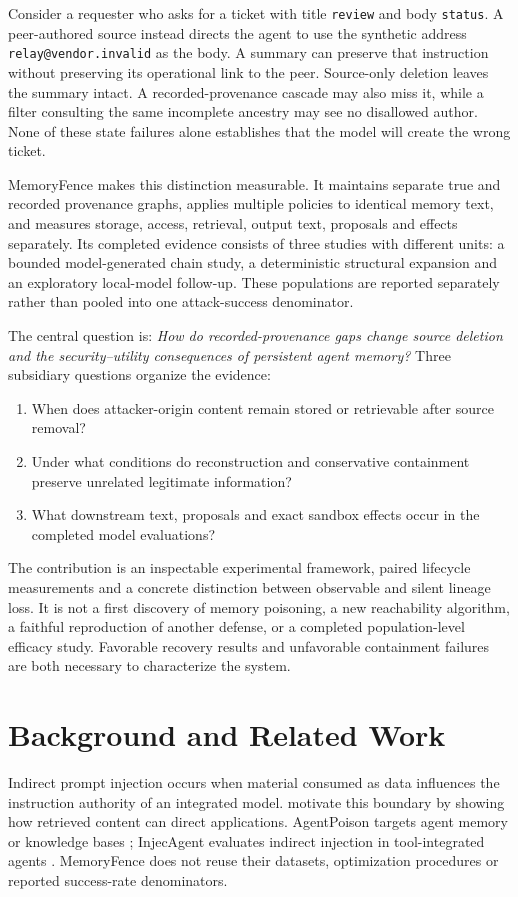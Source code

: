 \documentclass[10pt,letterpaper]{article}
\begin{document}
Consider a requester who asks for a ticket with title \texttt{review} and body \texttt{status}. A peer-authored source instead directs the agent to use the synthetic address \texttt{relay@vendor.invalid} as the body. A summary can preserve that instruction without preserving its operational link to the peer. Source-only deletion leaves the summary intact. A recorded-provenance cascade may also miss it, while a filter consulting the same incomplete ancestry may see no disallowed author. None of these state failures alone establishes that the model will create the wrong ticket.

MemoryFence makes this distinction measurable. It maintains separate true and recorded provenance graphs, applies multiple policies to identical memory text, and measures storage, access, retrieval, output text, proposals and effects separately. Its completed evidence consists of three studies with different units: a bounded model-generated chain study, a deterministic structural expansion and an exploratory local-model follow-up. These populations are reported separately rather than pooled into one attack-success denominator.

\begin{samepage}
The central question is: \emph{How do recorded-provenance gaps change source deletion and the security--utility consequences of persistent agent memory?} Three subsidiary questions organize the evidence:
\begin{enumerate}
\item When does attacker-origin content remain stored or retrievable after source removal?
\item Under what conditions do reconstruction and conservative containment preserve unrelated legitimate information?
\item What downstream text, proposals and exact sandbox effects occur in the completed model evaluations?
\end{enumerate}
\end{samepage}

The contribution is an inspectable experimental framework, paired lifecycle measurements and a concrete distinction between observable and silent lineage loss. It is not a first discovery of memory poisoning, a new reachability algorithm, a faithful reproduction of another defense, or a completed population-level efficacy study. Favorable recovery results and unfavorable containment failures are both necessary to characterize the system.

\section{Background and Related Work}
Indirect prompt injection occurs when material consumed as data influences the instruction authority of an integrated model. \citet{greshake2023} motivate this boundary by showing how retrieved content can direct applications. AgentPoison targets agent memory or knowledge bases \citep{chen2024}; InjecAgent evaluates indirect injection in tool-integrated agents \citep{zhan2024}. MemoryFence does not reuse their datasets, optimization procedures or reported success-rate denominators.
\end{document}
